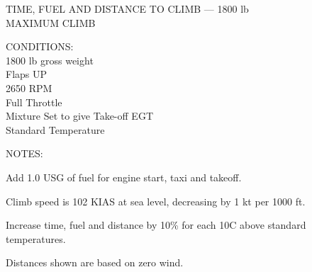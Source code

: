 \begin{figure}[t]
\begin{center}
\begin{perfhdr}TIME, FUEL AND DISTANCE TO CLIMB --- 1800 lb\\
MAXIMUM CLIMB\\
\end{perfhdr}
\Large

\normalsize \vspace{5ex} 
\raggedright 
    CONDITIONS:\\
    1800 lb gross weight\\
    Flaps UP\\
    2650 RPM\\
    Full Throttle\\
    Mixture Set to give Take-off EGT\\
    Standard Temperature\\

\hfill

\vspace{\perfnoteskip}
    \raggedright NOTES:
    \begin{enumerate*}
      \item Add 1.0 USG of fuel for engine start, taxi and takeoff.
      \item Climb speed is 102 KIAS at sea level, decreasing by 1 kt per 1000 ft.
      \item Increase time, fuel and distance by 10\% for each 10\textdegree C above standard
      temperatures.
      \item Distances shown are based on zero wind.
      \end{enumerate*}

\vspace{\perfnoteskip}
\settowidth{\colOne}{WEIGHT}
\settowidth{\colTwo}{PRESS.}
\settowidth{\colThree}{TEMP}
\settowidth{\colFour}{CLIMB}
\settowidth{\colFive}{RATE OF}
\settowidth{\colSix}{TIME}
\settowidth{\colSeven}{USED}
\settowidth{\colEight}{DIST.}


\end{center}
\end{figure}
